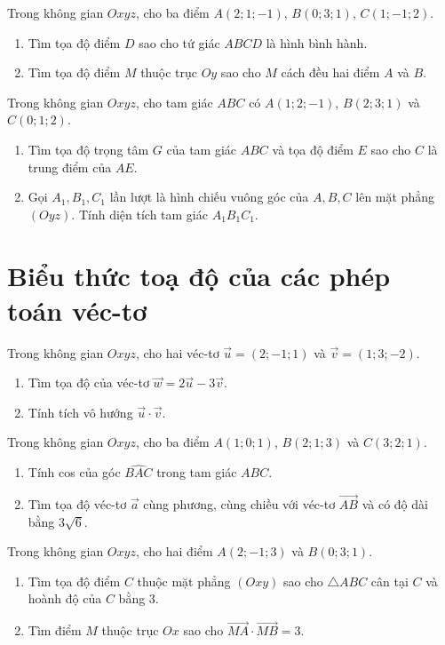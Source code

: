 \exercise Trong không gian $Oxyz$, cho ba điểm $A(2; 1; -1)$, $B(0; 3; 1)$, $C(1; -1; 2)$.
\begin{enumerate}
   \item Tìm tọa độ điểm $D$ sao cho tứ giác $ABCD$ là hình bình hành.
   \item Tìm tọa độ điểm $M$ thuộc trục $Oy$ sao cho $M$ cách đều hai điểm $A$ và $B$.
\end{enumerate}

\exercise Trong không gian $Oxyz$, cho tam giác $ABC$ có $A(1; 2; -1)$, $B(2; 3; 1)$ và $C(0; 1; 2)$.
\begin{enumerate}
   \item Tìm tọa độ trọng tâm $G$ của tam giác $ABC$ và tọa độ điểm $E$ sao cho $C$ là trung điểm của $AE$.
   \item Gọi $A_1, B_1, C_1$ lần lượt là hình chiếu vuông góc của $A, B, C$ lên mặt phẳng $(Oyz)$. Tính diện tích tam giác $A_1B_1C_1$.
\end{enumerate}

\section{Biểu thức toạ độ của các phép toán véc-tơ}

\exercise Trong không gian $Oxyz$, cho hai véc-tơ $\vec{u} = (2; -1; 1)$ và $\vec{v} = (1; 3; -2)$.
\begin{enumerate}
   \item Tìm tọa độ của véc-tơ $\vec{w} = 2\vec{u} - 3\vec{v}$.
   \item Tính tích vô hướng $\vec{u} \cdot \vec{v}$.
\end{enumerate}

\exercise Trong không gian $Oxyz$, cho ba điểm $A(1; 0; 1)$, $B(2; 1; 3)$ và $C(3; 2; 1)$.
\begin{enumerate}
   \item Tính cos của góc $\widehat{BAC}$ trong tam giác $ABC$.
   \item Tìm tọa độ véc-tơ $\vec{a}$ cùng phương, cùng chiều với véc-tơ $\overrightarrow{AB}$ và có độ dài bằng $3\sqrt{6}$.
\end{enumerate}

\exercise Trong không gian $Oxyz$, cho hai điểm $A(2; -1; 3)$ và $B(0; 3; 1)$.
\begin{enumerate}
   \item Tìm tọa độ điểm $C$ thuộc mặt phẳng $(Oxy)$ sao cho $\triangle ABC$ cân tại $C$ và hoành độ của $C$ bằng $3$.
   \item Tìm điểm $M$ thuộc trục $Ox$ sao cho $\overrightarrow{MA} \cdot \overrightarrow{MB} = 3$.
\end{enumerate}

